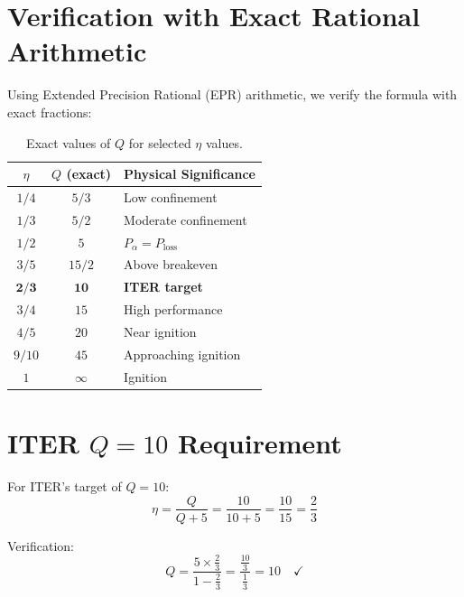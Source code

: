 \documentclass[11pt,a4paper]{article}
\begin{document}
\section{Verification with Exact Rational Arithmetic}

Using Extended Precision Rational (EPR) arithmetic, we verify the formula with exact fractions:

\begin{table}[h]
\centering
\begin{tabular}{|c|c|l|}
\hline
$\eta$ & $Q$ (exact) & Physical Significance \\
\hline
$1/4$ & $5/3$ & Low confinement \\
$1/3$ & $5/2$ & Moderate confinement \\
$1/2$ & $5$ & $P_\alpha = P_{\text{loss}}$ \\
$3/5$ & $15/2$ & Above breakeven \\
$\mathbf{2/3}$ & $\mathbf{10}$ & \textbf{ITER target} \\
$3/4$ & $15$ & High performance \\
$4/5$ & $20$ & Near ignition \\
$9/10$ & $45$ & Approaching ignition \\
$1$ & $\infty$ & Ignition \\
\hline
\end{tabular}
\caption{Exact values of $Q$ for selected $\eta$ values.}
\label{tab:verification}
\end{table}

\section{ITER $Q=10$ Requirement}

For ITER's target of $Q = 10$:
\begin{equation}
\eta = \frac{Q}{Q + 5} = \frac{10}{10 + 5} = \frac{10}{15} = \frac{2}{3}
\end{equation}

Verification:
\begin{equation}
Q = \frac{5 \times \frac{2}{3}}{1 - \frac{2}{3}} = \frac{\frac{10}{3}}{\frac{1}{3}} = 10 \quad \checkmark
\end{equation}
\end{document}
